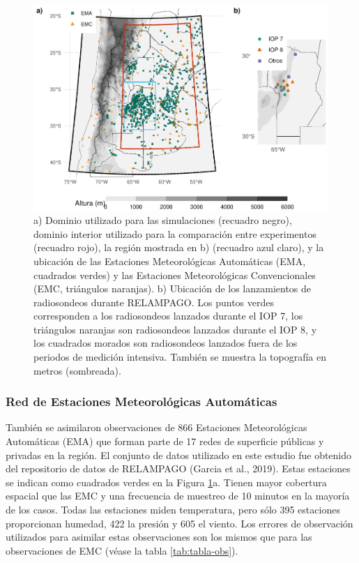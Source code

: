 \documentclass[12pt,oneside,a4paper]{reedthesis}
\begin{document}
\begin{figure}

{\centering \includegraphics[width=0.8\linewidth,]{thesis_files/figure-latex/dominio-1} 

}

\caption{a) Dominio utilizado para las simulaciones (recuadro negro), dominio interior utilizado para la comparación entre experimentos (recuadro rojo), la región mostrada en b) (recuadro azul claro), y la ubicación de las Estaciones Meteorológicas Automáticas (EMA, cuadrados verdes) y las Estaciones Meteorológicas Convencionales (EMC, triángulos naranjas). b) Ubicación de los lanzamientos de radiosondeos durante RELAMPAGO. Los puntos verdes corresponden a los radiosondeos lanzados durante el IOP 7, los triángulos naranjas son radiosondeos lanzados durante el IOP 8, y los cuadrados morados son radiosondeos lanzados fuera de los periodos de medición intensiva. También se muestra la topografía en metros (sombreada).}\label{fig:dominio}
\end{figure}
\hypertarget{ema}{%
\subsubsection{Red de Estaciones Meteorológicas Automáticas}\label{ema}}

También se asimilaron observaciones de 866 Estaciones Meteorológicas Automáticas (EMA) que forman parte de 17 redes de superficie públicas y privadas en la región. El conjunto de datos utilizado en este estudio fue obtenido del repositorio de datos de RELAMPAGO (Garcia et al., 2019). Estas estaciones se indican como cuadrados verdes en la Figura \ref{fig:dominio}a. Tienen mayor cobertura espacial que las EMC y una frecuencia de muestreo de 10 minutos en la mayoría de los casos. Todas las estaciones miden temperatura, pero sólo 395 estaciones proporcionan humedad, 422 la presión y 605 el viento.
Los errores de observación utilizados para asimilar estas observaciones son los mismos que para las observaciones de EMC (véase la tabla \ref{tab:tabla-obs}).
\end{document}
